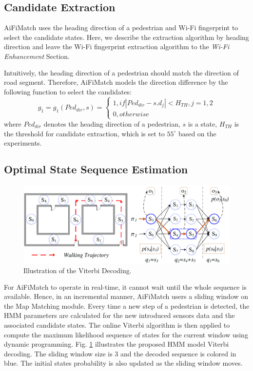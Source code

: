\documentclass{llncs}
\begin{document}
\subsection{Candidate Extraction}

AiFiMatch uses the heading direction of a pedestrian and Wi-Fi fingerprint to select the candidate states. Here, we describe the extraction algorithm by heading direction and leave the Wi-Fi fingerprint extraction algorithm to the \emph{Wi-Fi Enhancement} Section.
	 
Intuitively, the heading direction of a pedestrian should match the direction of road segment. Therefore, AiFiMatch models the direction difference by the following function to select the candidates:
\begin{equation}
{g_1} = {g_1}({Ped_{dir}},s) = \left\{ {\begin{array}{*{20}{l}}
	{1,if\left| {{Ped_{dir}} - s.{d_j}} \right| < H_{TH},j = 1,2}\\
	{0,otherwise}
	\end{array}} \right.
\end{equation}
where $Ped_{dir}$ denotes the heading direction of a pedestrian, $s$ is a state, $H_{TH}$ is the threshold for candidate extraction, which is set to $55^\circ$ based on the experiments.

\subsection{Optimal State Sequence Estimation}

\begin{figure}[!htbp]
	\vspace{-10pt}
	\centering
	\includegraphics[width=4.6in]{AiFiMatch-Viterbi}
	\caption{Illustration of the Viterbi Decoding.}
	\label{fig-viterbi}
	\vspace{-15pt}
\end{figure}

For AiFiMatch to operate in real-time, it cannot wait until the whole sequence is available. Hence, in an incremental manner, AiFiMatch users a sliding window on the Map Matching module. Every time a new step of a pedestrian is detected, the HMM parameters are calculated for the new introduced sensors data and the associated candidate states. The online Viterbi algorithm \cite{bloit2008short} is then applied to compute the maximum likelihood sequence of states for the current window using dynamic programming. Fig. \ref{fig-viterbi} illustrates the proposed HMM model Viterbi decoding. The sliding window size is $3$ and the decoded sequence is colored in blue. The initial states probability is also updated as the sliding window moves.
\end{document}

